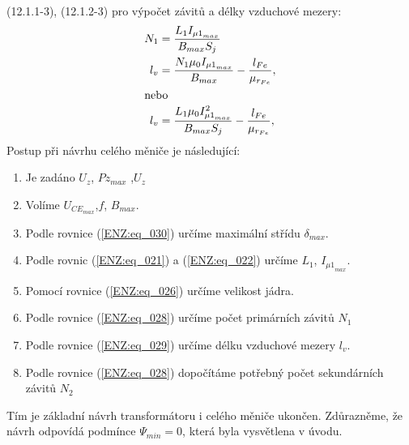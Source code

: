     (12.1.1-3), (12.1.2-3) pro výpočet závitů a délky vzduchové mezery:
    \begin{align}
      N_1 &= \frac{L_1I_{{\mu1}_{max}}}{B_{max}S_j}          \nonumber          \\
      l_v &= \frac{N_1\mu_0I_{{\mu1}_{max}}}{B_{max}} 
           - \frac{l_{Fe}}{\mu_{r_{Fe}}},                    \label{ENZ:eq_028} \\
      \shortintertext{nebo}
      l_v &= \frac{L_1\mu_0I^2_{{\mu1}_{max}}}{B_{max}S_j} 
             - \frac{l_{Fe}}{\mu_{r_{Fe}}},                  \label{ENZ:eq_029}  
    \end{align}
    Postup při návrhu celého měniče je následující:
    \begin{enumerate}\addtolength{\itemsep}{-0.5\baselineskip}
      \item Je zadáno \(U_z\), \(P{z_{max}}\) ,\(U_z\)
      \item Volíme \(U_{CE_{max}}\),\(f\), \(B_{max}\).
      \item Podle rovnice (\ref{ENZ:eq_030}) určíme maximální střídu \(\delta_{max}\).
      \item Podle rovnic (\ref{ENZ:eq_021}) a (\ref{ENZ:eq_022}) určíme \(L_1\), 
            \(I_{{\mu1}_{max}}\).
      \item Pomocí rovnice (\ref{ENZ:eq_026}) určíme velikost jádra.
      \item Podle rovnice (\ref{ENZ:eq_028}) určíme počet primárních závitů \(N_1\)
      \item Podle rovnice (\ref{ENZ:eq_029}) určíme délku vzduchové mezery \(l_v\).
      \item Podle rovnice (\ref{ENZ:eq_028}) dopočítáme potřebný počet sekundárních závitů \(N_2\)
    \end{enumerate}
    Tím je základní návrh transformátoru i celého měniče ukončen. Zdůrazněme, že návrh odpovídá 
    podmínce \(\Psi_{min}= 0\), která byla vysvětlena v úvodu.
  
